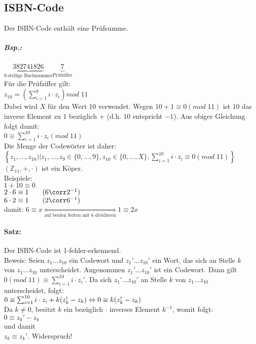 \subsection{ISBN-Code}
Der ISBN-Code enthält eine Prüfsumme.
\subparagraph{Bsp.:} $\underbrace{382741826}_{\text{9-stellige Buchnummer}} \underbrace{7}_{\text{Prüfziffer}}$\\
Für die Prüfziffer gilt:\\
$z_{10}=\left(\sum_{i=1}^9 i\cdot z_i\right) mod\; 11$\\
Dabei wird $X$ für den Wert 10 verwendet. Wegen $10+1\equiv0 (mod\; 11)$ ist $10$ das inverse Element zu $1$ bezüglich $+$ (d.h. $10$ entspricht $-1$). Aus obiger Gleichung folgt damit:\\
$0\equiv \sum_{i=1}^{10} i\cdot z_i(mod\; 11)$\\
Die Menge der Codewörter ist daher: \\
$\left\lbrace z_1,...,z_{10})|z_1,...,z_9\in \{0,...,9\}, z_{10} \in \{0,...,X\},\sum_{i=1}^{10} i\cdot z_i\equiv 0 (mod\; 11)\right\rbrace$\\
$(\mathbb{Z}_{11},+,\cdot)$ ist ein Köper.\\
Beispiele:\\
$1+10\equiv 0$\\
$2\cdot 6 \equiv 1 \qquad (6\corr 2^{-1})$\\
$6\cdot 2 \equiv 1 \qquad (2 \corr 6^{-1})$\\
damit: $6 \equiv x \underset{\text{auf beiden Seiten mit 6 dividieren}}{\Leftrightarrow} 1 \equiv 2x$
\paragraph{Satz:} Der ISBN-Code ist 1-fehler-erkennend.\\
Beweis: Seien $z_1...z_{10}$ ein Codewort und $z_1'...z_{10}'$ ein Wort, das sich an Stelle $k$ von $z_1...z_{10}$ unterscheidet. Angenommen $z_1'...z_{10}'$ ist ein Codewort. Dann gilt $0 (mod\; 11)\equiv \sum_{i=1}^{10} i\cdot z_i'$. Da sich $z_1'...z_{10}'$ an Stelle $k$ von $z_1...z_{10}$ unterscheidet, folgt:\\
$0 \equiv \sum_{i=1}^{10} i\cdot z_i+k(z_k'-z_k) \Leftrightarrow\\
0\equiv k(z_k'-z_k)$\\
Da $k\not = 0$, besitzt $k$ ein bezüglich $\cdot$ inverses Element $k^{-1}$, womit folgt:\\
$0 \equiv z_k'-z_k$\\
und damit\\
$z_k \equiv z_k'$. Widerspruch!
